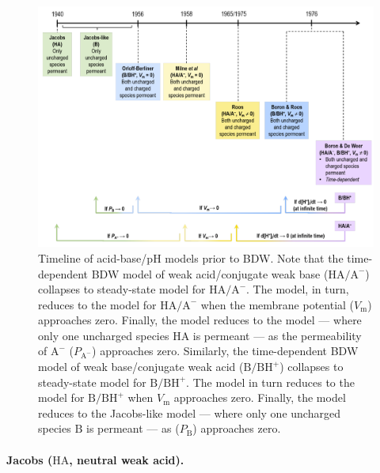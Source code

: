 \documentclass[fleqn,10pt]{physiome}
\begin{document}
\begin{figure}[ht]
\centering
\includegraphics[width=0.8\linewidth]{img/Figure 8.png}
\caption{\label{fig:8} Timeline of acid-base/$\mathrm{pH}$ models prior to BDW. Note that the time-dependent BDW model of weak acid/conjugate weak base ($\mathrm{HA}/\mathrm{A^-}$) collapses to \cite{roos1965intracellular,roos1975intracellular} steady-state model for $\mathrm{HA}/\mathrm{A^-}$. The \cite{roos1965intracellular,roos1975intracellular} model, in turn, reduces to the \cite{milne1958non} model for $\mathrm{HA}/\mathrm{A^-}$ when the membrane potential ($V_\mathrm{m}$) approaches zero. Finally, the \cite{milne1958non} model reduces to the \cite{jacobs1940some} model --- where only one uncharged species $\mathrm{HA}$ is permeant --- as the permeability of $\mathrm{A^-}$ ($P_\mathrm{A^-}$) approaches zero. Similarly, the time-dependent BDW model of weak base/conjugate weak acid ($\mathrm{B}/\mathrm{BH^+}$) collapses to \cite{boron1976comparison} steady-state model for $\mathrm{B}/\mathrm{BH^+}$. The \cite{boron1976comparison} model in turn reduces to the \cite{orloff1956mechanism} model for $\mathrm{B}/\mathrm{BH^+}$ when $V_\mathrm{m}$ approaches zero. Finally, the \cite{orloff1956mechanism} model reduces to the Jacobs-like model --- where only one uncharged species $\mathrm{B}$ is permeant --- as ($P_\mathrm{B}$) approaches zero.}
\end{figure}

\paragraph{Jacobs ($\mathrm{HA}$, neutral weak acid).}
\end{document}

